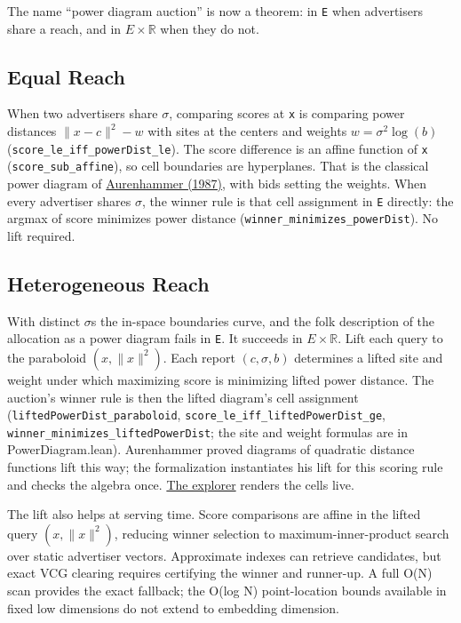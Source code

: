 The name ``power diagram auction'' is now a theorem: in \texttt{E} when
advertisers share a reach, and in \(E \times  \mathbb{R}\) when they do
not.

\subsection{Equal Reach}\label{equal-reach}

When two advertisers share \(\sigma\), comparing scores at \texttt{x} is
comparing power distances \(\|x - c\|^{2} - w\) with sites at the
centers and weights \(w = \sigma ^{2} \log(b)\)
(\texttt{score\_le\_iff\_powerDist\_le}). The score difference is an
affine function of \texttt{x} (\texttt{score\_sub\_affine}), so cell
boundaries are hyperplanes. That is the classical power diagram of
\href{https://doi.org/10.1137/0216006}{Aurenhammer (1987)}, with bids
setting the weights. When every advertiser shares \(\sigma\), the winner
rule is that cell assignment in \texttt{E} directly: the argmax of score
minimizes power distance (\texttt{winner\_minimizes\_powerDist}). No
lift required.

\subsection{Heterogeneous Reach}\label{heterogeneous-reach}

With distinct \(\sigma\)s the in-space boundaries curve, and the folk
description of the allocation as a power diagram fails in \texttt{E}. It
succeeds in \(E \times  \mathbb{R}\). Lift each query to the paraboloid
\((x, \|x\|^{2})\). Each report \((c, \sigma , b)\) determines a lifted
site and weight under which maximizing score is minimizing lifted power
distance. The auction's winner rule is then the lifted diagram's cell
assignment (\texttt{liftedPowerDist\_paraboloid},
\texttt{score\_le\_iff\_liftedPowerDist\_ge},
\texttt{winner\_minimizes\_liftedPowerDist}; the site and weight
formulas are in PowerDiagram.lean). Aurenhammer proved diagrams of
quadratic distance functions lift this way; the formalization
instantiates his lift for this scoring rule and checks the algebra once.
\hyperref[explorer]{The explorer} renders the cells live.

The lift also helps at serving time. Score comparisons are affine in the
lifted query \((x, \|x\|^{2})\), reducing winner selection to
maximum-inner-product search over static advertiser vectors. Approximate
indexes can retrieve candidates, but exact VCG clearing requires
certifying the winner and runner-up. A full O(N) scan provides the exact
fallback; the O(log N) point-location bounds available in fixed low
dimensions do not extend to embedding dimension.

